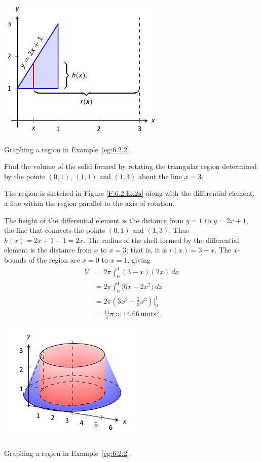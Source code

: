 \begin{marginfigure}[2cm] %
\includegraphics{figures/figshell2a}
\caption{Graphing a region in Example~\ref{eg:6.2.2}.} \label{F:6.2.Ex2a}
\end{marginfigure}

\begin{example} \label{eg:6.2.2} %
Find the volume of the solid formed by rotating the triangular region determined by the points $(0,1)$, $(1,1)$ and $(1,3)$ about the line $x=3$.

\solution
The region is sketched in Figure \ref{F:6.2.Ex2a} along with the differential element, a line within the region parallel to the axis of rotation. 

The height of the differential element is the distance from $y=1$ to $y=2x+1$, the line that connects the points $(0,1)$ and $(1,3)$. Thus $h(x) = 2x+1-1 = 2x$. The radius of the shell formed by the differential element is the distance from $x$ to $x=3$; that is, it is $r(x)=3-x$. The $x$-bounds of the region are $x=0$ to $x=1$, giving
\begin{align*}
V &=	2\pi\int_0^1 (3-x)(2x)\ dx \\
	&= 2\pi\int_0^1 \big(6x-2x^2)\ dx \\
	&= 2\pi\left(3x^2-\frac23x^3\right)\Big|_0^1\\
	&= \frac{14}{3}\pi\approx 14.66 \ \text{units}^3.
\end{align*}
\end{example}

\begin{marginfigure}[-5cm] %
\includegraphics{figures/figshell2b}
\caption{Graphing a region in Example~\ref{eg:6.2.2}.} \label{F:6.2.Ex2b}
\end{marginfigure}